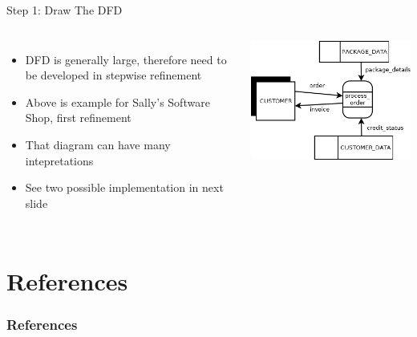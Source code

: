 \documentclass{beamer}
\begin{document}
	\begin{frame}{Step 1: Draw The DFD}
		\begin{columns}[t,totalwidth=\textwidth]
				\begin{itemize}
					\item DFD is generally large, therefore need to be developed in stepwise refinement
					\item Above is example for Sally's Software Shop, first refinement
					\item That diagram can have many intepretations
					\item See two possible implementation in next slide
				\end{itemize}			
				\begin{flushright}
					\includegraphics[scale=0.5]{img/01_sally_dfd_first_refinement}
				\end{flushright}
		\end{columns}		
	\end{frame}
	
	\section{References}
	\begin{frame}[allowframebreaks]
	        \frametitle{References}
	        
	        
	\end{frame}
\end{document}
